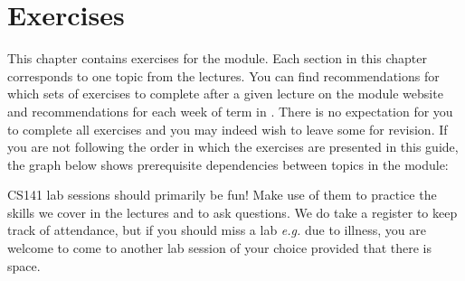 \documentclass[12pt,a4paper,twoside,fleqn]{report}
\author{Michael B. Gale}
\begin{document}
\pagestyle{empty}

\renewcommand{\headrulewidth}{0pt}
\renewcommand{\footrulewidth}{0pt}



\cleardoublepage

\fancyhf{}
\fancyfoot[LE,RO]{\thepage}
\pagestyle{fancy}
\thispagestyle{fancy}

\tableofcontents


\cleardoublepage
{}









\cleardoublepage
\chapter{Exercises}

This chapter contains exercises for the module. Each section in this chapter corresponds to one topic from the lectures. You can find recommendations for which sets of exercises to complete after a given lecture on the module website and recommendations for each week of term in . There is no expectation for you to complete all exercises and you may indeed wish to leave some for revision. If you are not following the order in which the exercises are presented in this guide, the graph below shows prerequisite dependencies between topics in the module:



CS141 lab sessions should primarily be fun! Make use of them to practice the skills we cover in the lectures and to ask questions. We do take a register to keep track of attendance, but if you should miss a lab \emph{e.g.} due to illness, you are welcome to come to another lab session of your choice provided that there is space.

%
%
 \newpage

%
%
 \newpage
\end{document}
